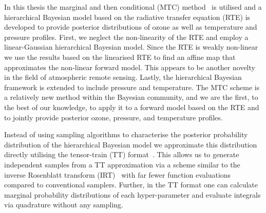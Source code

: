 In this thesis the marginal and then conditional (MTC) method~\cite{fox2016fast} is utilised and a hierarchical Bayesian model based on the radiative transfer equation (RTE) is developed to provide posterior distributions of ozone as well as temperature and pressure profiles.
First, we neglect the non-linearity of the RTE and employ a linear-Gaussian hierarchical Bayesian model.
Since the RTE is weakly non-linear we use the results based on the linearised RTE to find an affine map that approximates the non-linear forward model.
This appears to be another novelty in the field of atmospheric remote sensing.
Lastly, the hierarchical Bayesian framework is extended to include pressure and temperature.
The MTC scheme is a relatively new method within the Bayesian community, and we are the first, to the best of our knowledge, to apply it to a forward model based on the RTE and to jointly provide posterior ozone, pressure, and temperature profiles.

Instead of using sampling algorithms to characterise the posterior probability distribution of the hierarchical Bayesian model we approximate this distribution directly utilising the tensor-train (TT) format~\cite{cui2022deep}. 
This allows us to generate independent samples from a TT approximation via a scheme similar to the inverse Rosenblatt transform (IRT)~\cite{dolgov2020approximation} with far fewer function evaluations compared to conventional samplers.
Further, in the TT format one can calculate marginal probability distributions of each hyper-parameter and evaluate integrals via quadrature without any sampling.


